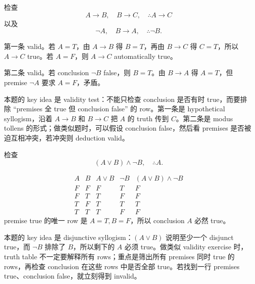 \begin{exerciseblock}
检查
\[
A\to B,\quad B\to C,\quad \therefore A\to C
\]
以及
\[
\lnot A,\quad B\to A,\quad \therefore \lnot B.
\]
\end{exerciseblock}

\begin{solution}
第一条 valid。若 \(A=T\)，由 \(A\to B\) 得 \(B=T\)，再由 \(B\to C\) 得 \(C=T\)，所以 \(A\to C\) true。若 \(A=F\)，则 \(A\to C\) automatically true。

第二条 valid。若 conclusion \(\lnot B\) false，则 \(B=T\)。由 \(B\to A\) 得 \(A=T\)，但 premise \(\lnot A\) 要求 \(A=F\)，矛盾。
\end{solution}

\begin{explanation}
本题的 key idea 是 validity test：不能只检查 conclusion 是否有时 true，而要排除 ``premises 全 true 但 conclusion false'' 的 row。第一条是 hypothetical syllogism，沿着 \(A\to B\) 和 \(B\to C\) 把 \(A\) 的 truth 传到 \(C\)。第二条是 modus tollens 的形式；做类似题时，可以假设 conclusion false，然后看 premises 是否被迫互相冲突，若冲突则 deduction valid。
\end{explanation}

\begin{exerciseblock}
检查
\[
(A\lor B)\land\lnot B,\quad \therefore A.
\]
\end{exerciseblock}

\begin{solution}
\[
\begin{array}{cc|ccc}
A&B&A\lor B&\lnot B&(A\lor B)\land\lnot B\\
\hline
F&F&F&T&F\\
F&T&T&F&F\\
T&F&T&T&T\\
T&T&T&F&F
\end{array}
\]
premise true 的唯一 row 是 \(A=T,B=F\)，所以 conclusion \(A\) 必然 true。
\end{solution}

\begin{explanation}
本题的 key idea 是 disjunctive syllogism：\((A\lor B)\) 说明至少一个 disjunct true，而 \(\lnot B\) 排除了 \(B\)，所以剩下的 \(A\) 必须 true。做类似 validity exercise 时，truth table 不一定要解释所有 rows；重点是筛出所有 premises 同时 true 的 rows，再检查 conclusion 在这些 rows 中是否全部 true。若找到一行 premises true、conclusion false，就立刻得到 invalid。
\end{explanation}

